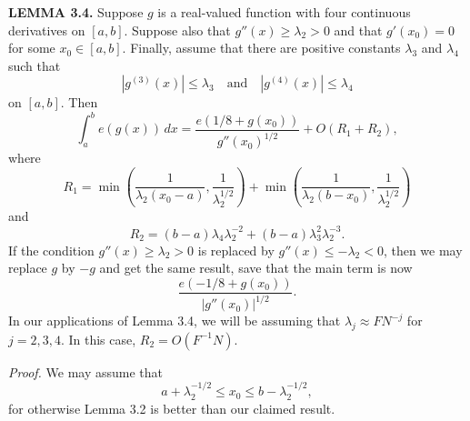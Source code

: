 \documentclass[10pt]{article}
\begin{document}
\medskip
\noindent\textbf{LEMMA 3.4.}
Suppose $g$ is a real-valued function with four continuous derivatives on
$[a,b]$. Suppose also that $g''(x)\geq\lambda_2>0$ and that $g'(x_0)=0$ for
some $x_0\in[a,b]$. Finally, assume that there are positive constants
$\lambda_3$ and $\lambda_4$ such that
\[
 |g^{(3)}(x)|\leq\lambda_3
 \quad\text{and}\quad
 |g^{(4)}(x)|\leq\lambda_4
\]
on $[a,b]$. Then
\begin{equation*}
 \int_a^b e(g(x))\,dx
 =\frac{e(1/8+g(x_0))}{g''(x_0)^{1/2}}+O(R_1+R_2), \tag{3.2.1}
\end{equation*}
where
\[
 R_1=
 \min\left(\frac{1}{\lambda_2(x_0-a)},\frac1{\lambda_2^{1/2}}\right)
 +\min\left(\frac{1}{\lambda_2(b-x_0)},\frac1{\lambda_2^{1/2}}\right)
\]
and
\[
 R_2=(b-a)\lambda_4\lambda_2^{-2}
     +(b-a)\lambda_3^2\lambda_2^{-3}.
\]
If the condition $g''(x)\geq\lambda_2>0$ is replaced by
$g''(x)\leq-\lambda_2<0$, then we may replace $g$ by $-g$ and get the same
result, save that the main term is now
\[
 \frac{e(-1/8+g(x_0))}{|g''(x_0)|^{1/2}}.
\]
In our applications of Lemma 3.4, we will be assuming that
$\lambda_j\approx FN^{-j}$ for $j=2,3,4$. In this case, $R_2=O(F^{-1}N)$.

\noindent\textit{Proof.}
We may assume that
\begin{equation*}
 a+\lambda_2^{-1/2}\leq x_0\leq b-\lambda_2^{-1/2}, \tag{3.2.2}
\end{equation*}
for otherwise Lemma 3.2 is better than our claimed result.
\end{document}
